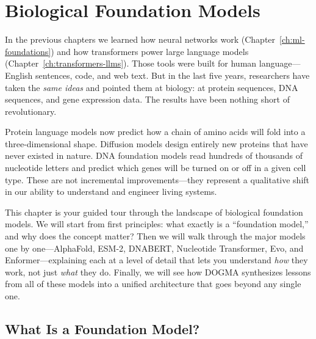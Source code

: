 
\chapter{Biological Foundation Models}
\label{ch:bio-foundation-models}


\noindent
In the previous chapters we learned how neural networks work (Chapter~\ref{ch:ml-foundations}) and how transformers power large language models (Chapter~\ref{ch:transformers-llms}). Those tools were built for human language---English sentences, code, and web text. But in the last five years, researchers have taken the \emph{same ideas} and pointed them at biology: at protein sequences, DNA sequences, and gene expression data. The results have been nothing short of revolutionary.

Protein language models now predict how a chain of amino acids will fold into a three-dimensional shape. Diffusion models design entirely new proteins that have never existed in nature. DNA foundation models read hundreds of thousands of nucleotide letters and predict which genes will be turned on or off in a given cell type. These are not incremental improvements---they represent a qualitative shift in our ability to understand and engineer living systems.

This chapter is your guided tour through the landscape of biological foundation models. We will start from first principles: what exactly is a ``foundation model,'' and why does the concept matter? Then we will walk through the major models one by one---AlphaFold, ESM-2, DNABERT, Nucleotide Transformer, Evo, and Enformer---explaining each at a level of detail that lets you understand \emph{how} they work, not just \emph{what} they do. Finally, we will see how DOGMA synthesizes lessons from all of these models into a unified architecture that goes beyond any single one.

\section{What Is a Foundation Model?}
\label{sec:foundation-models-intro}

